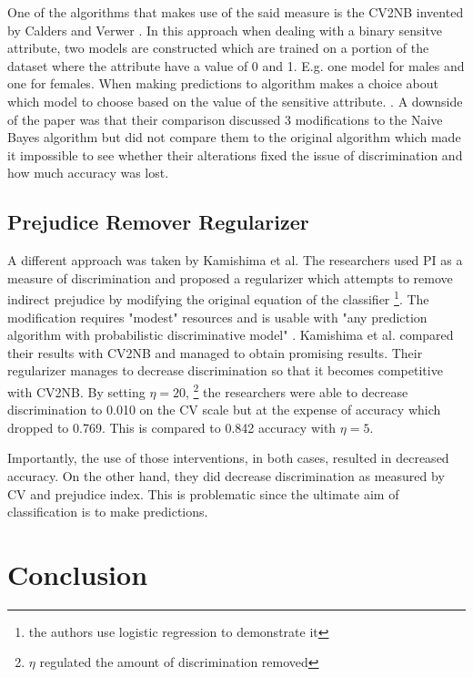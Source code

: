 \documentclass[a4paper, 12pt, notitlepage]{article}
\begin{document}
One of the algorithms that makes use of the said measure is the CV2NB invented by Calders and Verwer \cite{calders2010}. In this approach when dealing with a binary sensitve attribute, two models are constructed which are trained on a portion of the dataset where the attribute have a value of 0 and 1. E.g. one model for males and one for females. When making predictions to algorithm makes a choice about which model to choose based on the value of the sensitive attribute. \cite[p.~283]{calders2010}. A downside of the paper was that their comparison discussed 3 modifications to the Naive Bayes algorithm but did not compare them to the original algorithm which made it impossible to see whether their alterations fixed the issue of discrimination and how much accuracy was lost.

\subsection*{Prejudice Remover Regularizer}

A different approach was taken by Kamishima et al. The researchers used PI as a measure of discrimination and proposed a regularizer which attempts to remove indirect prejudice by modifying the original equation of the classifier \footnote{the authors use logistic regression to demonstrate it}. The modification requires "modest" resources and is usable with "any prediction algorithm with probabilistic discriminative model" \cite[p.~35]{kamishima2012b}. Kamishima et al. compared their results with CV2NB and managed to obtain promising results. Their regularizer manages to decrease discrimination so that it becomes competitive with CV2NB. By setting $\eta = 20$, \footnote{$\eta$ regulated the amount of discrimination removed} the researchers  were able to decrease discrimination to 0.010 on the CV scale but at the expense of accuracy which dropped to 0.769. This is compared to 0.842 accuracy with $\eta = 5$.

\vspace{0.3cm}

Importantly, the use of those interventions, in both cases, resulted in decreased accuracy. On the other hand, they did decrease discrimination as measured by CV and prejudice index. \cite[p.~44]{kamishima2012b} \cite{calders2010} This is problematic since the ultimate aim of classification is to make  predictions.

\section*{Conclusion}
\end{document}
